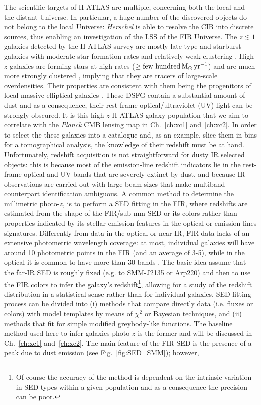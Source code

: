 The scientific targets of H-ATLAS are multiple, concerning both the local and the distant Universe. In particular, a huge number of the discovered objects do not belong to the local Universe: \textit{Herschel} is able to resolve the \gls{CIB} into discrete sources, thus enabling an investigation of the \gls{LSS} of the \gls{FIR} Universe.
The $z\lesssim 1$ galaxies detected by the H-ATLAS survey are mostly late-type and starburst galaxies with moderate star-formation rates and relatively weak clustering  \citep{Dunne2011,Guo2011}. High-$z$ galaxies are forming stars at high rates ($\ge \hbox{few hundred}\,\hbox{M}_\odot\,\hbox{yr}^{-1}$) and are much more strongly clustered \citep{Maddox2010,Xia2012}, implying that they are tracers of large-scale overdensities. Their properties are consistent with them being the progenitors of local massive elliptical galaxies \citep{Lapi2011}. These \gls{DSFG} contain a substantial amount of dust and as a consequence, their rest-frame optical/ultraviolet (UV) light can be strongly obscured. It is this high-$z$ H-ATLAS galaxy population that we aim to correlate with the \textit{Planck} CMB lensing map in Ch.~\eqref{ch:xc1} and~\eqref{ch:xc2}. In order to select the these galaxies into a catalogue and, as an example, slice them in bins for a tomographical analysis, the knowledge of their redshift must be at hand. Unfortunately, redshift acquisition is not straightforward for dusty \gls{IR} selected objects: this is because most of the emission-line redshift indicators lie in the rest-frame optical and UV bands that are severely extinct by dust, and because \gls{IR} observations are carried out with large beam sizes that make multiband counterpart identification ambiguous. A common method to determine the millimetric photo-$z$, is to perform a \gls{SED} fitting in the \gls{FIR}, where redshifts are estimated from the shape of the \gls{FIR}/sub-mm \gls{SED} or its colors rather than properties indicated by its stellar emission features in the optical or emission-lines signatures. Differently from data in the optical or near-\gls{IR}, \gls{FIR} data lacks of an extensive photometric wavelength coverage: at most, individual galaxies will have around 10 photometric points in the \gls{FIR} (and an average of 3-5), while in the optical it is common to have more than 30 bands \citep{Casey2014}. The basic idea assume that the far-\gls{IR} \gls{SED} is roughly fixed (e.g. to SMM-J2135 or Arp220) and then to use the \gls{FIR} colors to infer the galaxy's redshift\footnote{Of course the accuracy of the method is dependent on the intrinsic variation in \gls{SED} types within a given population and as a consequence the precision can be poor.}, allowing for a study of the redshift distribution in a statistical sense rather than for individual galaxies. \gls{SED} fitting process can be divided into (i) methods that compare directly data (i.e. fluxes or colors) with model templates by means of $\chi^2$ or Bayesian techniques, and (ii) methods that fit for simple modified greybody-like functions. The baseline method used here to infer galaxies photo-$z$ is the former and will be discussed in Ch.~\eqref{ch:xc1} and~\eqref{ch:xc2}. The main feature of the \gls{FIR} \gls{SED} is the presence of a peak due to dust emission (see Fig.~\eqref{fig:SED_SMM}); however, 